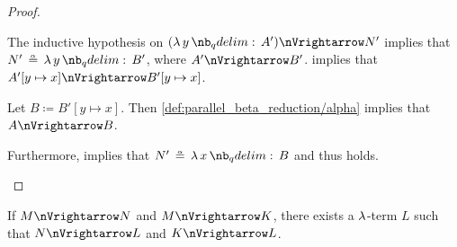 \begin{proof}
\begin{itemize}
\begin{itemize}
      The inductive hypothesis on \( (\qabs y A') \pred N' \) implies that \( N' \aequiv \qabs y B' \), where \( A' \pred B' \).  implies that \( A'[y \mapsto x] \pred B'[y \mapsto x] \).

      Let \( B \coloneqq B'[y \mapsto x] \). Then \ref{def:parallel_beta_reduction/alpha} implies that \( A \pred B \).

      Furthermore,  implies that \( N' \aequiv \qabs x B \) and thus  holds.
    \end{itemize}
  \end{itemize}
\end{proof}

\begin{proposition}\label{thm:parallel_beta_church_rosser}
  If \( M \pred N \) and \( M \pred K \), there exists a \( \mathrm{\lambda} \)-term \( L \) such that \( N \pred L \) and \( K \pred L \).
\end{proposition}
